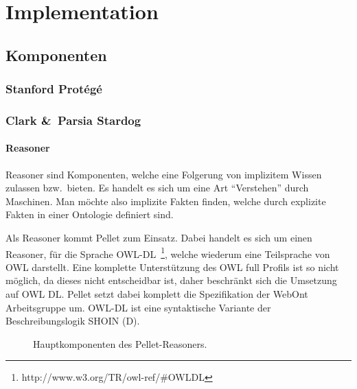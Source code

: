 \chapter{Implementation}
\label{chap:implementation}


\section{Komponenten}
\label{sec:komponenten}

\subsection{Stanford Protégé}
\label{subsec:protege}

\subsection{Clark &\ Parsia Stardog}
\label{subsec:stardog}

\subsubsection{Reasoner}
\label{ssubsec:reasoner}
Reasoner sind Komponenten, welche eine Folgerung von implizitem Wissen zulassen bzw.\ bieten. Es handelt es sich um eine Art ``Verstehen'' durch Maschinen. Man möchte also implizite Fakten finden, welche durch explizite Fakten in einer Ontologie definiert sind. 

Als Reasoner kommt Pellet zum Einsatz. Dabei handelt es sich um einen Reasoner, für die Sprache OWL-DL~\footnote{http://www.w3.org/TR/owl-ref/\#OWLDL}, welche wiederum eine Teilsprache von OWL darstellt. Eine komplette Unterstützung des OWL full Profils ist so nicht möglich, da dieses nicht entscheidbar ist, daher beschränkt sich die Umsetzung auf OWL DL\@. Pellet setzt dabei komplett die Spezifikation der WebOnt Arbeitsgruppe um. OWL-DL ist eine syntaktische Variante der Beschreibungslogik SHOIN (D).

\begin{figure}[htbp]
\centering {}
\caption{Hauptkomponenten des Pellet-Reasoners.\label{fig:pellet_komponenten}\protect\footnotemark}
\end{figure}

